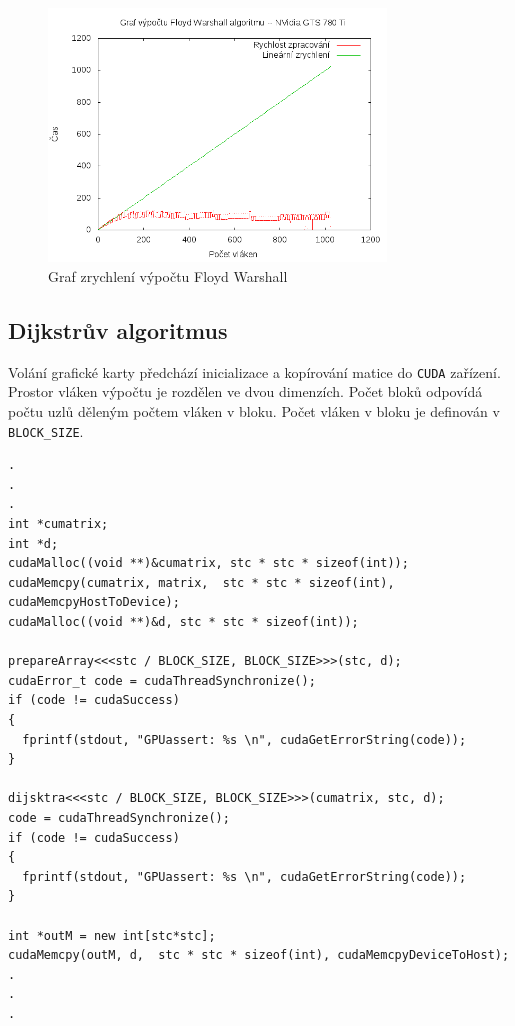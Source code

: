 \documentclass[10pt,a4paper]{article}
\begin{document}
\begin{figure}[H]
  \centering
    \includegraphics[width=0.8\textwidth]{graf_floyd_gts_780_Ti.png}
  \caption{Graf zrychlení výpočtu Floyd Warshall}
  \label{fig:floydcudatwo}
\end{figure}

\subsection{Dijkstrův algoritmus}

Volání grafické karty předchází inicializace a kopírování matice do \texttt{CUDA} zařízení. Prostor vláken výpočtu je rozdělen ve dvou dimenzích. Počet bloků odpovídá počtu uzlů děleným počtem vláken v bloku. Počet vláken v bloku je definován v \texttt{BLOCK\_SIZE}.

\begin{verbatim}
.
.
.
int *cumatrix; 
int *d;
cudaMalloc((void **)&cumatrix, stc * stc * sizeof(int));
cudaMemcpy(cumatrix, matrix,  stc * stc * sizeof(int), cudaMemcpyHostToDevice);
cudaMalloc((void **)&d, stc * stc * sizeof(int));

prepareArray<<<stc / BLOCK_SIZE, BLOCK_SIZE>>>(stc, d);
cudaError_t code = cudaThreadSynchronize();  
if (code != cudaSuccess)
{
  fprintf(stdout, "GPUassert: %s \n", cudaGetErrorString(code));
}

dijsktra<<<stc / BLOCK_SIZE, BLOCK_SIZE>>>(cumatrix, stc, d);
code = cudaThreadSynchronize();  
if (code != cudaSuccess)
{
  fprintf(stdout, "GPUassert: %s \n", cudaGetErrorString(code));
}
  
int *outM = new int[stc*stc];
cudaMemcpy(outM, d,  stc * stc * sizeof(int), cudaMemcpyDeviceToHost);
.
.
.
\end{verbatim}
\end{document}
